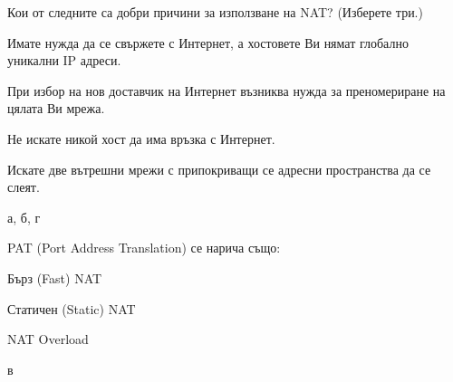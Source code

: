 \begin{q}
  Кои от следните са добри причини за използване на NAT? (Изберете три.)
  \begin{defractors}
    \item Имате нужда да се свържете с Интернет, а хостовете Ви нямат глобално
      уникални IP адреси.
    \item При избор на нов доставчик на Интернет възниква нужда за преномериране
      на цялата Ви мрежа.
    \item Не искате никой хост да има връзка с Интернет.
    \item Искате две вътрешни мрежи с припокриващи се адресни пространства да се
      слеят.
  \end{defractors}
  \rans а, б, г
\end{q}

\begin{q}
  PAT (Port Address Translation) се нарича също:
  \begin{defractors}
    \item Бърз (Fast) NAT
    \item Статичен (Static) NAT
    \item NAT Overload
  \end{defractors}
  \rans в
\end{q}
